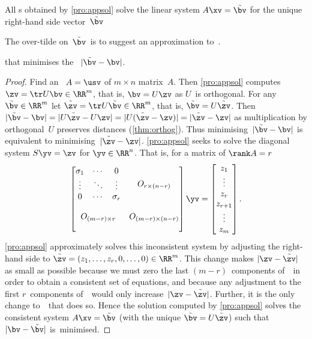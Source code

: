 \begin{theorem} \label{thm:appsol} 
All s obtained by \autoref{pro:appsol} solve the linear system \(A\xv=\tilde\bv\) for the unique  right-hand side vector~\(\tilde\bv\) 
\begin{aside} The over-tilde on~\(\tilde\bv\)\ is to suggest an approximation to~\bv. \end{aside}%
that minimises the ~\(|\tilde\bv-\bv|\).
\end{theorem}
\begin{proof} 
Find an \svd\ \(A=\usv\) of \(m\times n\) matrix~\(A\).
Then \autoref{pro:appsol} computes \(\zv=\tr U\bv\in\RR^m\), that is, \(\bv=U\zv\) as \(U\)~is orthogonal.
For any \(\tilde\bv\in\RR^m\) let \(\tilde\zv=\tr U\tilde\bv\in\RR^m\), that is, \(\tilde\bv=U\tilde\zv\).
Then \(|\tilde\bv-\bv|=|U\tilde\zv-U\zv|=|U(\tilde\zv-\zv)|=|\tilde\zv-\zv|\) as multiplication by orthogonal~\(U\) preserves distances (\autoref{thm:orthog}).
Thus minimising~\(|\tilde\bv-\bv|\) is equivalent to minimising~\(|\tilde\zv-\zv|\).
\autoref{pro:appsol} seeks to solve the diagonal system \(S\yv=\zv\) for \(\yv\in\RR^n\). 
That is, for a matrix of \(\rank A=r\)
\begin{equation*}
\begin{bmatrix} \begin{matrix} \sigma_1&\cdots&0\\
\vdots&\ddots&\vdots\\
0&\cdots&\sigma_r \end{matrix} & 
O_{r\times (n-r)}\\\,\\
O_{(m-r)\times r}&O_{(m-r)\times (n-r)}
\\\,\end{bmatrix}\yv
=\begin{bmatrix} z_1\\\vdots\\z_r\\z_{r+1}\\\vdots\\z_m \end{bmatrix}.
\end{equation*}
\autoref{pro:appsol} approximately solves this inconsistent system by adjusting the right-hand side to \(\tilde\zv=(z_1,\ldots,z_r,0,\ldots,0)\in\RR^m\).
This change makes \(|\zv-\tilde\zv|\) as small as possible because we must zero the last \((m-r)\)~components of~\zv\ in order to obtain a consistent set of equations, and because any adjustment to the first \(r\)~components of~\zv\ would only increase~\(|\zv-\tilde\zv|\).
Further, it is the only change to~\zv\ that does so.
Hence the solution computed by \autoref{pro:appsol} solves the consistent system \(A\xv=\tilde\bv\) (with the unique \(\tilde\bv=U\tilde\zv\)) such that \(|\bv-\tilde\bv|\) is~minimised.
\end{proof}




